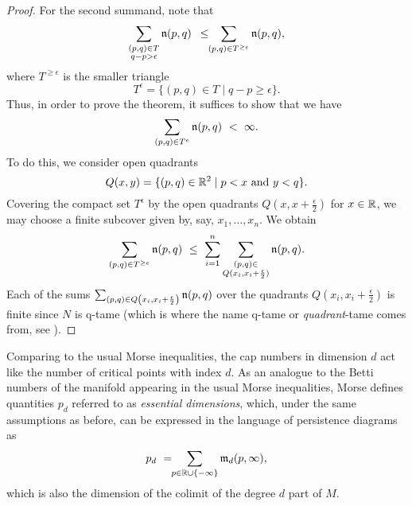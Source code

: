 \begin{proof}
	For the second summand, note that
	\begin{equation*}
	\sum_{ \substack{ (p,q) \in T \\ q-p > \epsilon } } \mathfrak{n} (p,q)
	\ \, \leq \!\!
	\sum_{(p,q) \in T^{\geq e}} \mathfrak{n} (p,q),
	\end{equation*}
	where $T^{\geq \epsilon}$ is the smaller triangle 
	\begin{equation*}
	T^{\epsilon} = \{(p,q) \in T \mid q-p \geq \epsilon\}.
	\end{equation*}
	Thus, in order to prove the theorem, it suffices to show that we have 
	\begin{equation*}
	\sum_{(p,q) \in T^{e}} \n (p,q) 
	\ < \ 
	\infty.
	\end{equation*}
	To do this, we consider open quadrants 
	\begin{equation*}
	Q(x, y) = \{ (p, q) \in \mathbb{R}^2 \mid p < x \text{ and } y < q \}.
	\end{equation*}
	Covering the compact set $T^{\epsilon}$ by the open quadrants $Q \left(x, x + \frac{\epsilon}{2} \right)$ for $x \in \mathbb{R}$, we may choose a finite subcover given by, say, $x_1,\dots, x_n$.
	We obtain
	\begin{equation*}
	\sum_{(p,q) \in T^{\geq e}} \mathfrak{n} (p,q) 
	\ \leq \
	\sum_{i=1}^n \sum_{\substack{(p, q) \in \\ Q (x_i, x_i + \frac{\epsilon}{2})}} \mathfrak{n}(p,q).
	\end{equation*}
	Each of the sums $\sum_{(p,q) \in Q \left(x_i, x_i + \frac{\epsilon}{2} \right)} \mathfrak{n}(p,q)$ over the quadrants $Q \left(x_i, x_i + \frac{\epsilon}{2} \right)$ is finite since $N$ is q-tame (which is where the name q-tame or \emph{quadrant}-tame comes from, see \cite[Section 3.8]{Chazal.2016a}).
\end{proof}

Comparing to the usual Morse inequalities, the cap numbers in dimension $d$ act like the number of critical points with index $d$.
As an analogue to the Betti numbers of the manifold appearing in the usual Morse inequalities, Morse defines quantities $p_{d}$ referred to as \emph{essential dimensions}, which, under the same assumptions as before, can be expressed in the language of persistence diagrams as
\begin{equation} \label{e:essential dimension}
p_{d} \ = \!\! \sum_{p \in \mathbb{R} \cup \{-\infty\}} \mathfrak{m}_d(p,\infty),
\end{equation}
which is also the dimension of the colimit of the degree $d$ part of $M$.

